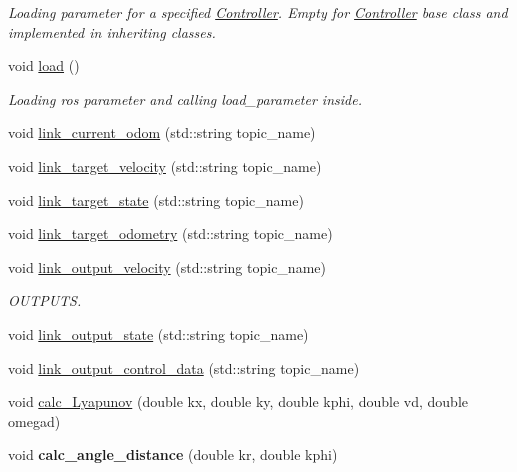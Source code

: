 \begin{DoxyCompactItemize}
\begin{DoxyCompactList}\small\item\em Loading parameter for a specified \hyperlink{classController}{Controller}. Empty for \hyperlink{classController}{Controller} base class and implemented in inheriting classes. \end{DoxyCompactList}\item 
void \hyperlink{classController_a55c77d2e41634c9b21543647f74eec4c}{load} ()\hypertarget{classController_a55c77d2e41634c9b21543647f74eec4c}{}\label{classController_a55c77d2e41634c9b21543647f74eec4c}

\begin{DoxyCompactList}\small\item\em Loading ros parameter and calling load\+\_\+parameter inside. \end{DoxyCompactList}\item 
void \hyperlink{classController_add4a8227097c30e5f165977cfa0ce22c}{link\+\_\+current\+\_\+odom} (std\+::string topic\+\_\+name)
\item 
void \hyperlink{classController_a82a7c805f6e4e0689c675134903e9e58}{link\+\_\+target\+\_\+velocity} (std\+::string topic\+\_\+name)
\item 
void \hyperlink{classController_a5f5318b08e7b99d2e5f09c59a6eb61aa}{link\+\_\+target\+\_\+state} (std\+::string topic\+\_\+name)
\item 
void \hyperlink{classController_a7bf32883aed714275c99d6d182993b73}{link\+\_\+target\+\_\+odometry} (std\+::string topic\+\_\+name)
\item 
void \hyperlink{classController_afdf03808aee4a1cfcf65a7198ab1a9aa}{link\+\_\+output\+\_\+velocity} (std\+::string topic\+\_\+name)
\begin{DoxyCompactList}\small\item\em O\+U\+T\+P\+U\+TS. \end{DoxyCompactList}\item 
void \hyperlink{classController_a9b8949013d52e365754e170a9cad158c}{link\+\_\+output\+\_\+state} (std\+::string topic\+\_\+name)
\item 
void \hyperlink{classController_abc1909639580e5359228c87fbd3a622b}{link\+\_\+output\+\_\+control\+\_\+data} (std\+::string topic\+\_\+name)
\item 
void \hyperlink{classController_a56568ee07bb72983576e9d7c10eb3e83}{calc\+\_\+\+Lyapunov} (double kx, double ky, double kphi, double vd, double omegad)
\item 
void {\bfseries calc\+\_\+angle\+\_\+distance} (double kr, double kphi)\hypertarget{classController_a63249412728814430174c740d358a5c0}{}\label{classController_a63249412728814430174c740d358a5c0}


\end{DoxyCompactItemize}

